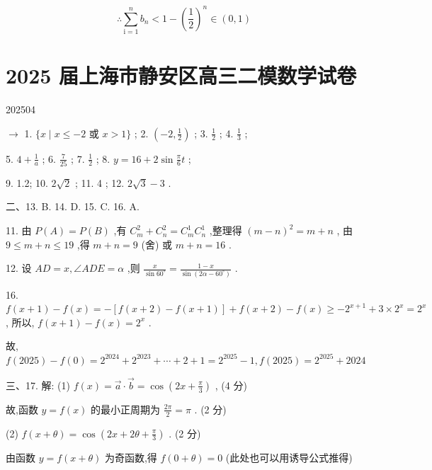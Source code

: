\documentclass[10pt]{article}
\begin{document}
\[
\therefore \mathop{\sum }\limits_{{\mathrm{i} = 1}}^{n}{b}_{n} < 1 - {\left( \frac{1}{2}\right) }^{n} \in  \left( {0,1}\right)
\]

\section*{2025 届上海市静安区高三二模数学试卷}

202504

\(\rightarrow\) 1. \(\{ x \mid  x \leq   - 2\) 或 \(x > 1\}\) ; 2. \(\left( {-2,\frac{1}{2}}\right)\) ; 3. \(\frac{1}{2}\) ; 4. \(\frac{1}{3}\) ;

5. \(4 + \frac{1}{a}\) ; 6. \(\frac{7}{25}\) ; 7. \(\frac{1}{2}\) ; 8. \(y = {16} + 2\sin \frac{\pi }{6}t\) ;

9. 1.2; 10. \(2\sqrt{2}\) ; 11. 4 ; 12. \(2\sqrt{3} - 3\) .

二、13. B. 14. D. 15. C. 16. A.

11. 由 \(P\left( A\right)  = P\left( B\right)\) ,有 \({C}_{m}^{2} + {C}_{n}^{2} = {C}_{m}^{1}{C}_{n}^{1}\) ,整理得 \({\left( m - n\right) }^{2} = m + n\) , 由 \(9 \leq  m + n \leq  {19}\) ,得 \(m + n = 9\) (舍) 或 \(m + n = {16}\) .

12. 设 \({AD} = x,\angle {ADE} = \alpha\) ,则 \(\frac{x}{\sin {60}^{ \circ  }} = \frac{1 - x}{\sin \left( {{2\alpha } - {60}^{ \circ  }}\right) }\) .

16. \(f\left( {x + 1}\right)  - f\left( x\right)  =  - \left\lbrack  {f\left( {x + 2}\right)  - f\left( {x + 1}\right) }\right\rbrack   + f\left( {x + 2}\right)  - f\left( x\right)  \geq   - {2}^{x + 1} + 3 \times  {2}^{x} = {2}^{x}\) , 所以, \(f\left( {x + 1}\right)  - f\left( x\right)  = {2}^{x}\) .

故, \(f\left( {2025}\right)  - f\left( 0\right)  = {2}^{2024} + {2}^{2023} + \cdots  + 2 + 1 = {2}^{2025} - 1,f\left( {2025}\right)  = {2}^{2025} + {2024}\)

三、17. 解: (1) \(f\left( x\right)  = \overrightarrow{a} \cdot  \overrightarrow{b} = \cos \left( {{2x} + \frac{\pi }{3}}\right)\) , (4 分)

故,函数 \(y = f\left( x\right)\) 的最小正周期为 \(\frac{2\pi }{2} = \pi\) . (2 分)

(2) \(f\left( {x + \theta }\right)  = \cos \left( {{2x} + {2\theta } + \frac{\pi }{3}}\right)\) . (2 分)

由函数 \(y = f\left( {x + \theta }\right)\) 为奇函数,得 \(f\left( {0 + \theta }\right)  = 0\) (此处也可以用诱导公式推得)
\end{document}
